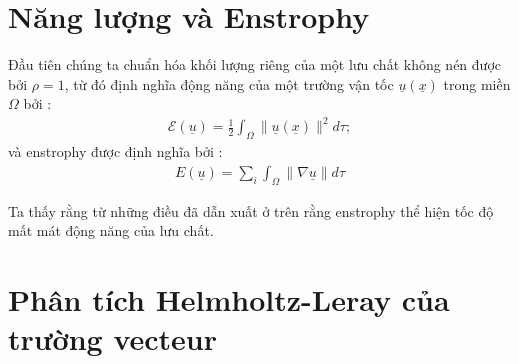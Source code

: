 \documentclass[CO_LUU_CHAT.tex]{subfiles}
\begin{document}
\section{Năng lượng và Enstrophy}

Đầu tiên chúng ta chuẩn hóa khối lượng riêng của một lưu chất không nén được bởi $\rho=1$, từ đó định nghĩa động năng của một trường vận tốc $\underline{u}\left(\underline{x}\right)$ trong miền $\Omega$ bởi :
\begin{equation}
	\begin{aligned}
		\mathscr{E}\left(\underline{u}\right)=\frac{1}{2}\int_\Omega \|\underline{u}\left(\underline{x}\right)\|^2d\tau;
	\end{aligned}
\end{equation}
và enstrophy được định nghĩa bởi :
\begin{equation}
	\begin{aligned}
		E\left(\underline{u}\right) = \sum\limits_i\int_\Omega\left\|\nabla  \underline{u}\right\|d\tau
	\end{aligned}
\end{equation}

Ta thấy rằng từ những điều đã dẫn xuất ở trên rằng enstrophy thể hiện tốc độ mất mát động năng của lưu chất.

\section{Phân tích Helmholtz-Leray của trường vecteur}
\end{document}
